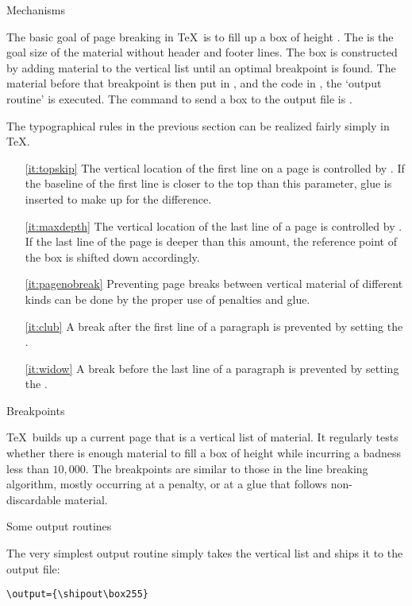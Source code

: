  {Mechanisms}

The basic goal of page breaking in \TeX\ is to fill up a box of height
. The is the goal size of the material without header and
footer lines. The box is constructed by adding material to the
vertical list until an optimal breakpoint is found. The material
before that breakpoint is then put in , and the code in
, the `output routine' is
executed. The command to send a box to the output file is .

The typographical rules in the previous section can be realized fairly
simply in \TeX.
\begin{itemize}
\item[\ref{it:topskip}] The vertical location of the first line on a
  page is controlled by . If the baseline of the first
  line is closer to the top than this parameter, glue is inserted to
  make up for the difference.
\item[\ref{it:maxdepth}] The vertical location of the last line of a
  page is controlled by . If the last line of the page is
  deeper than this amount, the reference point of the box is shifted
  down accordingly.
\item[\ref{it:pagenobreak}] Preventing page breaks between vertical
  material of different kinds can be done by the proper use of
  penalties and glue.
\item[\ref{it:club}] A break after the first line
  of a paragraph is prevented by setting the .
\item[\ref{it:widow}] A break before the last line
  of a paragraph is prevented by setting the .
\end{itemize}

 {Breakpoints}

\TeX\ builds up a current page that is a vertical list of material. It
regularly tests whether there is enough material to fill a box of
height  while incurring a badness less than $10,000$.
The breakpoints are similar to those in the line breaking algorithm,
mostly occurring at a penalty, or at a glue that follows
non-discardable material.

 {Some output routines}

The very simplest output routine simply takes the vertical list and
ships it to the output file:
\begin{verbatim}
\output={\shipout\box255}
\end{verbatim}

